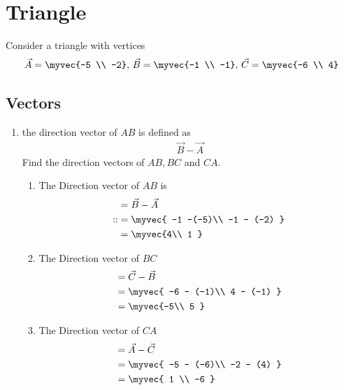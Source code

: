 \documentclass[11pt]{book}
\begin{document}
\frontmatter
{}
\subtitle{Through Algebra}
\titlepage
\tableofcontents
\setcounter{page}{1}
\mainmatter
\chapter{Triangle}
Consider a triangle with vertices
\begin{align}
\vec{A} = \myvec{-5 \\ -2},\,
\vec{B} = \myvec{-1 \\ -1},\,
\vec{C} = \myvec{-6 \\ 4}
\end{align}
\section{Vectors}
\begin{enumerate}[label=\thesection.\arabic*.,ref=\thesection.\theenumi]
\item the direction vector of $AB$ is defined as 
\begin{align}
 \vec{B}-
  \vec{A}
\end{align}
Find the direction vectors of $AB, BC$ and $CA$.
\\
\solution
\begin{enumerate} 
\item  The Direction vector of $AB$ is 
\begin{align}&= \vec{B} - \vec{A} \\::
 &= \myvec{ -1  -(-5)\\ -1 - (-2) } \\&= \myvec{4\\ 1 }
 \end{align}
\item The Direction vector of $BC$ 
\begin{align}&= \vec{C} - \vec{B}\\
 &= \myvec{ -6 - (-1)\\ 4 - (-1) } \\&= \myvec{-5\\ 5 }
  \end{align}
  \item  The Direction vector of $CA$  
  \begin{align} &= \vec{A} - \vec{C} \\ 
 &= \myvec{ -5 - (-6)\\ -2 - (4) } \\&= \myvec{ 1 \\ -6 }
  \end{align}

\end{enumerate}
\end{enumerate}
\end{document}
